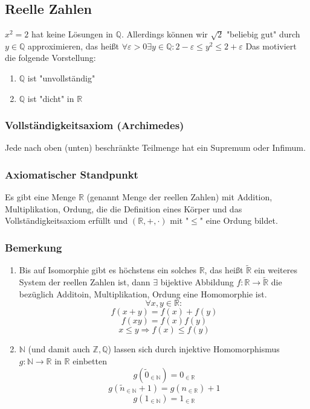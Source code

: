 \documentclass[a4paper]{scrartcl}
\DeclareMathOperator{\Forall}{\forall}%
\begin{document}
\subsection{Reelle Zahlen}
\label{sec-2-9}
$x^2 = 2$ hat keine Lösungen in $\mathbb{Q}$. Allerdings können wir $\sqrt{2}$ "beliebig gut" durch $y\in \mathbb{Q}$ approximieren, das heißt $\Forall \varepsilon > 0\exists y\in\mathbb{Q}:2 - \varepsilon \leq y^2 \leq 2 + \varepsilon$
Das motiviert die folgende Vorstellung:
\begin{enumerate}
\item $\mathbb{Q}$ ist "unvollständig"
\item $\mathbb{Q}$ ist "dicht" in $\mathbb{R}$
\end{enumerate}
\subsubsection{Vollständigkeitsaxiom (Archimedes)}
\label{sec-2-9-1}
Jede nach oben (unten) beschränkte Teilmenge hat ein Supremum oder Infimum.
\subsubsection{Axiomatischer Standpunkt}
\label{sec-2-9-2}
Es gibt eine Menge $\mathbb{R}$ (genannt Menge der reellen Zahlen) mit Addition, Multiplikation, Ordung, die die Definition eines Körper und das Vollständigkeitsaxiom erfüllt und $(\mathbb{R},+,\cdot)$ mit "$\leq$" eine Ordung bildet.
\subsubsection{Bemerkung}
\label{sec-2-9-3}
\begin{enumerate}
\item Bis auf Isomorphie gibt es höchstens ein solches $\mathbb{R}$, das heißt $\tilde{\mathbb{R}}$ ein weiteres System der reellen Zahlen ist, dann $\exists$ bijektive Abbildung $f:\mathbb{R}\to\tilde{\mathbb{R}}$ die bezüglich Additoin, Multiplikation, Ordung eine Homomorphie ist.
\[\Forall x,y\in \mathbb{R}:\]
\[f(x+y) = f(x) + f(y)\]
\[f(x y) = f(x) f(y)\]
\[x\leq y \Rightarrow f(x) \leq f(y)\]
\item $\mathbb{N}$ (und damit auch $\mathbb{Z},\mathbb{Q}$) lassen sich durch injektive Homomorphismus $g:\mathbb{N}\to\mathbb{R}$ in $\mathbb{R}$ einbetten
\[g(\tilde{0}_{\in\mathbb{N}}) = 0_{\in\mathbb{R}}\]
\[g(\tilde{n}_{\in\mathbb{N}} + 1) = g(n_{\in\mathbb{R}}) + 1\]
\[g(1_{\in\mathbb{N}}) = 1_{\in\mathbb{R}}\]
\end{enumerate}
\end{document}
